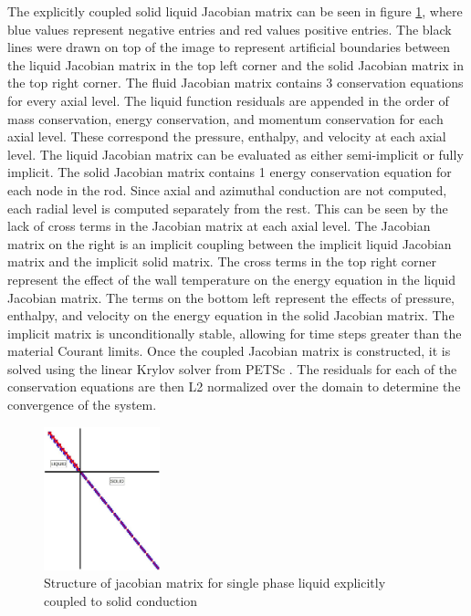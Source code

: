 	The explicitly coupled solid liquid Jacobian matrix can be seen in figure
	\ref{fig:Explicit-Diagram}, where blue values represent negative entries and
	red values positive entries. The black lines were drawn on top of the image to
	represent artificial boundaries between the liquid Jacobian matrix in the top
	left corner and the solid Jacobian matrix in the top right corner. The fluid
	Jacobian matrix contains 3 conservation equations for every axial level. The
	liquid function residuals are appended in the order of mass conservation,
	energy conservation, and momentum conservation for each axial level. These
	correspond the pressure, enthalpy, and velocity at each axial level. The liquid
	Jacobian matrix can be evaluated as either semi-implicit or fully implicit. The
	solid Jacobian matrix contains 1 energy conservation equation for each node in
	the rod. Since axial and azimuthal conduction are not computed, each radial
	level is computed separately from the rest. This can be seen by the lack of
	cross terms in the Jacobian matrix at each axial level. The Jacobian matrix on
	the right is an implicit coupling between the implicit liquid Jacobian matrix
	and the implicit solid matrix. The cross terms in the top right corner
	represent the effect of the wall temperature on the energy equation in the
	liquid Jacobian matrix. The terms on the bottom left represent the effects of
	pressure, enthalpy, and velocity on the energy equation in the solid Jacobian
	matrix. The implicit matrix is unconditionally stable, allowing for time steps
	greater than the material Courant limits. Once the coupled Jacobian matrix is
	constructed, it is solved using the linear Krylov solver \cite{kelly2003} from
	PETSc \cite{PETSc}. The residuals for each of the conservation equations are
	then L2 normalized over the domain to determine the convergence of the system.
	
	\begin{figure}[!h]
    	\centering
    	\includegraphics[width=0.30\textwidth]{images/Explicit-Diagram.jpg}
    	\caption{Structure of jacobian matrix for single phase liquid
    	explicitly coupled to solid conduction}
    	\label{fig:Explicit-Diagram}
    \end{figure}
    
